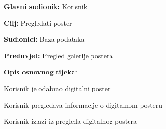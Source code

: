 					\noindent {}
					\begin{packed_item}
						
						\item \textbf{Glavni sudionik: } Korisnik
						\item  \textbf{Cilj:} Pregledati poster
						\item  \textbf{Sudionici:} Baza podataka
						\item  \textbf{Preduvjet:} Pregled galerije postera
						\item  \textbf{Opis osnovnog tijeka:}
						
						\item[] \begin{packed_enum}
							
							\item Korisnik je odabrao digitalni poster
							\item Korisnik pregledava informacije o digitalnom posteru
							\item Korisnik izlazi iz pregleda digitalnog postera
						\end{packed_enum}
						
					\end{packed_item}
					

